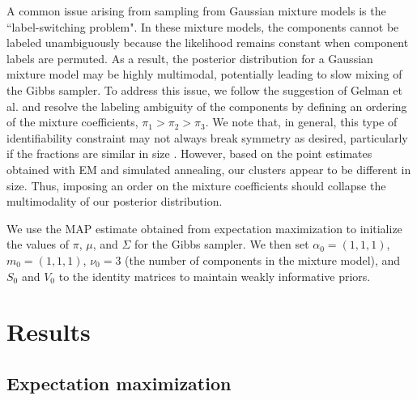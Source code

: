 \documentclass[twoside]{article}
\theoremstyle{theorem}
\theoremstyle{theorem}
\theoremstyle{theorem}
\theoremstyle{lemma}
\theoremstyle{definition}
\theoremstyle{example}
\begin{document}
A common issue arising from sampling from Gaussian mixture models is the ``label-switching problem". In these mixture models, the components cannot be labeled unambiguously because the likelihood remains constant when component labels are permuted.  As a result, the posterior distribution for a Gaussian mixture model may be highly multimodal, potentially leading to slow mixing of the Gibbs sampler. To address this issue, we follow the suggestion of Gelman et al. \cite{Gelman} and  resolve the labeling ambiguity of the components by defining an ordering of the mixture coefficients, $\pi_1 > \pi_2 > \pi_3$. We note that, in general, this type of identifiability constraint may not always break symmetry as desired, particularly if the fractions are similar in size \cite{Stephens}. However, based on the point estimates obtained with EM and simulated annealing, our clusters appear to be different in size. Thus, imposing an order on the mixture coefficients should collapse the multimodality of our posterior distribution.

We use the MAP estimate obtained from expectation maximization to initialize the values of $\pi$, $\mu$, and $\Sigma$ for the Gibbs sampler. We then set $\alpha_0 = (1,1,1)$, $m_0 = (1,1,1)$, $\nu_0 = 3$ (the number of components in the mixture model), and $S_0$ and $V_0$ to the identity matrices to maintain weakly informative priors.   

\section{Results}

\subsection{Expectation maximization}
\end{document}
